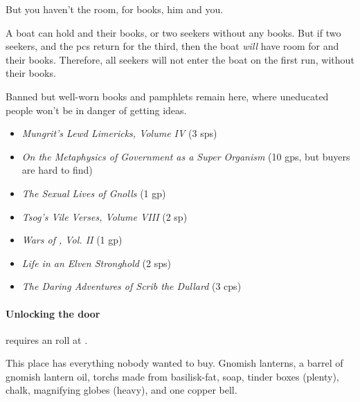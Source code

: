 \begin{multicols}{2}
\begin{boxtext}
  But you haven't the room, for books, him and you.
\end{boxtext}

A boat can hold  and their books, or two \glspl{seeker} without any books.
But if two \glspl{seeker}, and the \glspl{pc} return for the third, then the boat \emph{will} have room for  and their books.
Therefore, all \glspl{seeker} will not enter the boat on the first run, without their books.





Banned but well-worn books and pamphlets remain here, where uneducated people won't be in danger of getting ideas.

\begin{itemize}
  \item
  \textit{Mungrit's Lewd Limericks, Volume IV} (3 \glspl{sp})
  \item
  \textit{On the Metaphysics of Government as a Super Organism} (10 \glspl{gp}, but buyers are hard to find)
  \item
  \textit{The Sexual Lives of Gnolls} (1 \gls{gp})
  \item
  \textit{Tsog's Vile Verses, Volume VIII} (2 sp)
  \item
  \textit{Wars of , Vol. II} (1 \gls{gp})
  \item
  \textit{Life in an Elven Stronghold} (2 \glspl{sp})
  \item
  \textit{The Daring Adventures of Scrib the Dullard} (3 \glspl{cp})
\end{itemize}

\paragraph{Unlocking the door}
requires an  roll at \tn[13].


This place has everything nobody wanted to buy.
Gnomish lanterns, a barrel of gnomish lantern oil, \glspl{torch} made from \gls{basilisk}-fat, soap, tinder boxes (plenty), chalk, magnifying globes (heavy), and one copper bell.


\end{multicols}
